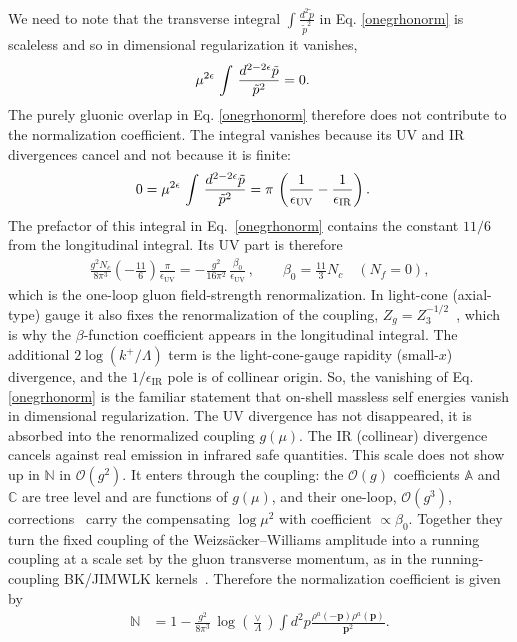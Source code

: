 \documentclass[a4paper,11pt]{article}
\def\v#1{\mathbf{#1}}
\def\mf#1{\mathbb{#1}}
\begin{document}
{\color{blue} We need to note that the transverse integral $\int \frac{d^2\tilde p}{\tilde p^2}$  in Eq. \eqref{onegrhonorm} is scaleless and so in dimensional regularization it vanishes, 
\begin{align}
    \mu^{2\epsilon}\, \int\, \frac{d^{2-2\epsilon}\Tilde{p}}{\Tilde{p}^{2}} & = 0 .
\end{align}
The purely gluonic overlap in Eq. \eqref{onegrhonorm} therefore does not contribute to the normalization coefficient. The integral vanishes because its UV and IR divergences cancel and not because {\color{chg}it is} finite:
\begin{align}
    0 &  =  \mu^{2\epsilon}\, \int\, \frac{d^{2-2\epsilon}\Tilde{p}}{\Tilde{p}^{2}} = \pi\,\left(\frac{1}{\epsilon_{\mathrm{UV}}} - \frac{1}{\epsilon_{\mathrm{IR}}}\right).
\end{align}
{\color{chg}The prefactor of this integral in Eq.~\eqref{onegrhonorm} contains the constant $11/6$ from the longitudinal integral. Its UV part is therefore
\begin{align}
\frac{g^{2}N_{c}}{8\pi^{3}}\left(-\frac{11}{6}\right)\frac{\pi}{\epsilon_{\mathrm{UV}}}=-\frac{g^{2}}{16\pi^{2}}\,\frac{\beta_{0}}{\epsilon_{\mathrm{UV}}}\,,\qquad \beta_{0}=\frac{11}{3}N_{c}\quad(N_{f}=0),
\end{align}
which is the one-loop gluon field-strength renormalization. In light-cone (axial-type) gauge it also fixes the renormalization of the coupling, $Z_{g}=Z_{3}^{-1/2}$~\cite{Leibbrandt:1987qv}, which is why the $\beta$-function coefficient appears in the longitudinal integral. The additional $2\log(k^{+}/\Lambda)$ term is the light-cone-gauge rapidity (small-$x$) divergence, and the $1/\epsilon_{\mathrm{IR}}$ pole is of collinear origin.}
So, the vanishing of Eq. \eqref{onegrhonorm} is the familiar statement that on-shell massless self energies vanish in dimensional regularization. The UV divergence has not disappeared, it is absorbed into the {\color{chg}renormalized} coupling $g(\mu)$. The IR (collinear) divergence cancels against real emission in infrared safe quantities. This scale does not show up in $\mf{N}$ in $\mathcal{O}(g^{2})$. {\color{chg}It enters through the coupling: the $\mathcal{O}(g)$ coefficients $\mf{A}$ and $\mf{C}$ are tree level and are functions of $g(\mu)$, and their one-loop, $\mathcal{O}(g^{3})$, corrections~\cite{Lublinsky:2016meo} carry the compensating $\log\mu^{2}$ with coefficient $\propto\beta_{0}$. Together they turn the fixed coupling of the Weizs\"acker--Williams amplitude into a running coupling at a scale set by the gluon transverse momentum, as in the running-coupling BK/JIMWLK kernels~\cite{Balitsky:2006wa,Kovchegov:2006vj}.} Therefore the normalization coefficient is given by
\begin{align}\label{eq:norma1}
\mf{N} & =   1 - \frac{g^2}{8 \pi^3 }\,\log{\left(\frac{\vee}{\Lambda}\right)}
  \int d^2p \frac{\rho^a(-\v{p}) \rho^a(\v{p})}{\v{p}^2}.
\end{align}}
\end{document}
